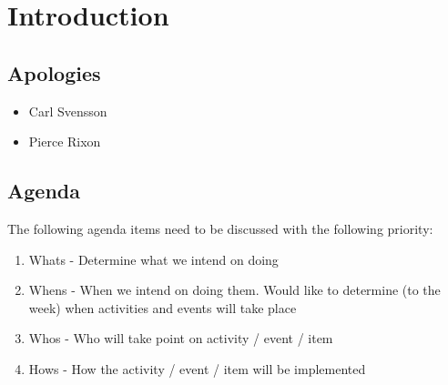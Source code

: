 \section{Introduction}
\label{sec:Introduction}
\subsection{Apologies}
\begin{itemize}
  \item Carl Svensson
  \item Pierce Rixon
\end{itemize}

\subsection{Agenda}
The following agenda items need to be discussed with the following priority: 
\begin{enumerate}
\item Whats - Determine what we intend on doing
\item Whens - When we intend on doing them. Would like to determine (to the
week) when activities and events will take place
\item Whos - Who will take point on activity / event / item 
\item Hows - How the activity / event / item will be implemented
\end{enumerate}